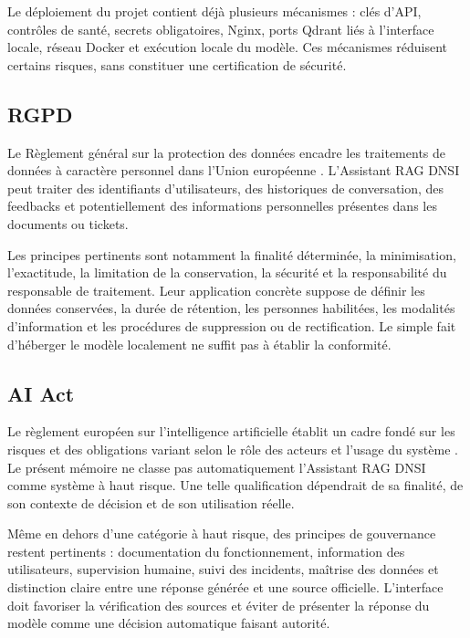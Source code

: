 Le déploiement du projet contient déjà plusieurs mécanismes : clés d'API, contrôles de santé, secrets obligatoires, Nginx, ports Qdrant liés à l'interface locale, réseau Docker et exécution locale du modèle. Ces mécanismes réduisent certains risques, sans constituer une certification de sécurité.

\subsection{RGPD}

Le Règlement général sur la protection des données encadre les traitements de données à caractère personnel dans l'Union européenne \citep{EU2016GDPR}. L'Assistant RAG DNSI peut traiter des identifiants d'utilisateurs, des historiques de conversation, des feedbacks et potentiellement des informations personnelles présentes dans les documents ou tickets.

Les principes pertinents sont notamment la finalité déterminée, la minimisation, l'exactitude, la limitation de la conservation, la sécurité et la responsabilité du responsable de traitement. Leur application concrète suppose de définir les données conservées, la durée de rétention, les personnes habilitées, les modalités d'information et les procédures de suppression ou de rectification. Le simple fait d'héberger le modèle localement ne suffit pas à établir la conformité.

\subsection{AI Act}

Le règlement européen sur l'intelligence artificielle établit un cadre fondé sur les risques et des obligations variant selon le rôle des acteurs et l'usage du système \citep{EU2024AIAct}. Le présent mémoire ne classe pas automatiquement l'Assistant RAG DNSI comme système à haut risque. Une telle qualification dépendrait de sa finalité, de son contexte de décision et de son utilisation réelle.

Même en dehors d'une catégorie à haut risque, des principes de gouvernance restent pertinents : documentation du fonctionnement, information des utilisateurs, supervision humaine, suivi des incidents, maîtrise des données et distinction claire entre une réponse générée et une source officielle. L'interface doit favoriser la vérification des sources et éviter de présenter la réponse du modèle comme une décision automatique faisant autorité.
